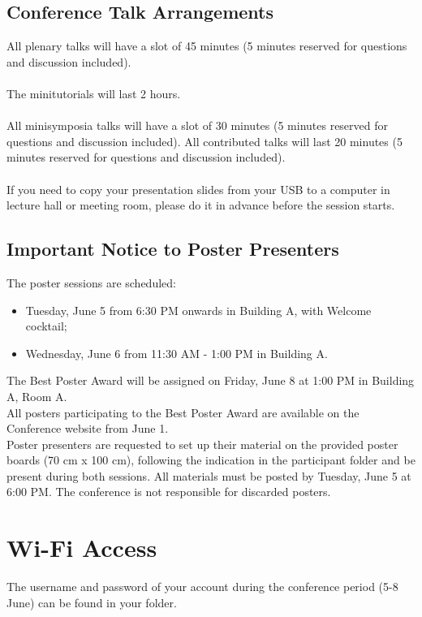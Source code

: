 \begin{multicols}{2}
\subsection*{Conference Talk Arrangements}
All plenary talks will have a slot of 45 minutes
(5 minutes reserved for questions and discussion included).\\\\
The minitutorials will last 2 hours.\\\\
All minisymposia talks will have a slot of 30 minutes (5 minutes reserved for questions and discussion included).
All contributed talks will last 20 minutes (5 minutes reserved for questions and discussion included).\\\\
If you need to copy your presentation slides from your USB to a
computer in lecture hall or meeting room, please do it in advance before
the session starts.
\subsection*{Important Notice to Poster Presenters}
The poster sessions are scheduled:
\begin{itemize}
\item Tuesday, June 5 from 6:30 PM onwards in Building A, with Welcome cocktail;
\item Wednesday, June 6 from 11:30 AM - 1:00 PM in Building A.
\end{itemize} 
The Best Poster Award will be assigned on Friday, June 8 at 1:00 PM in Building A, Room A.\\
All posters participating to the Best Poster Award are available on the Conference website from June 1.\\
Poster presenters are requested to set up
their material on the provided poster boards (70 cm x 100 cm), following the indication in the participant folder and be present during both sessions.  
All materials must
be posted by Tuesday, June 5 at
6:00 PM.
The conference is not responsible for
discarded posters.
\section*{Wi-Fi Access}
The username and password of your account during the conference period (5-8 June) can be found in your folder.

\end{multicols}
